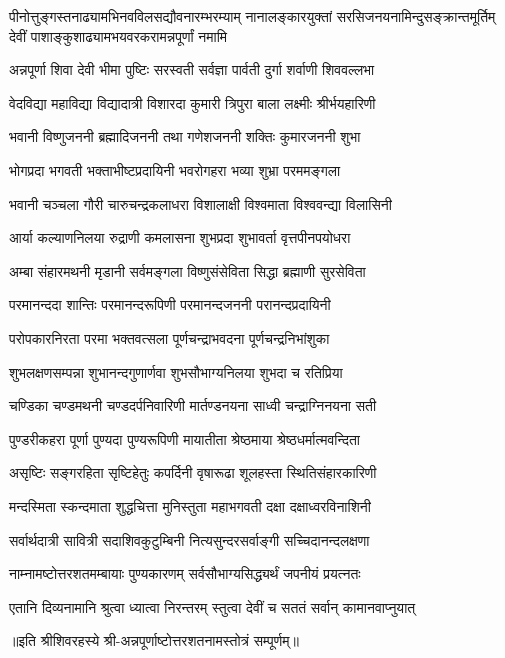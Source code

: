 
{पीनोत्तुङ्गस्तनाढ्यामभिनवविलसद्यौवनारम्भरम्याम्}
{नानालङ्कारयुक्तां सरसिजनयनामिन्दुसङ्क्रान्तमूर्तिम्}
{देवीं पाशाङ्कुशाढ्यामभयवरकरामन्नपूर्णां नमामि}


\twolineshloka
{अन्नपूर्णा शिवा देवी भीमा पुष्टिः सरस्वती}
{सर्वज्ञा पार्वती दुर्गा शर्वाणी शिववल्लभा}

\twolineshloka
{वेदविद्या महाविद्या विद्यादात्री विशारदा}
{कुमारी त्रिपुरा बाला लक्ष्मीः श्रीर्भयहारिणी}

\twolineshloka
{भवानी विष्णुजननी ब्रह्मादिजननी तथा}
{गणेशजननी शक्तिः कुमारजननी शुभा}

\twolineshloka
{भोगप्रदा भगवती भक्ताभीष्टप्रदायिनी}
{भवरोगहरा भव्या शुभ्रा परममङ्गला}

\twolineshloka
{भवानी चञ्चला गौरी चारुचन्द्रकलाधरा}
{विशालाक्षी विश्वमाता विश्ववन्द्या विलासिनी}

\twolineshloka
{आर्या कल्याणनिलया रुद्राणी कमलासना}
{शुभप्रदा शुभावर्ता वृत्तपीनपयोधरा}

\twolineshloka
{अम्बा संहारमथनी मृडानी सर्वमङ्गला}
{विष्णुसंसेविता सिद्धा ब्रह्माणी सुरसेविता}

\twolineshloka
{परमानन्ददा शान्तिः परमानन्दरूपिणी}
{परमानन्दजननी परानन्दप्रदायिनी}

\twolineshloka
{परोपकारनिरता परमा भक्तवत्सला}
{पूर्णचन्द्राभवदना पूर्णचन्द्रनिभांशुका}

\twolineshloka
{शुभलक्षणसम्पन्ना शुभानन्दगुणार्णवा}
{शुभसौभाग्यनिलया शुभदा च रतिप्रिया}

\twolineshloka
{चण्डिका चण्डमथनी चण्डदर्पनिवारिणी}
{मार्तण्डनयना साध्वी चन्द्राग्निनयना सती}

\twolineshloka
{पुण्डरीकहरा पूर्णा पुण्यदा पुण्यरूपिणी}
{मायातीता श्रेष्ठमाया श्रेष्ठधर्मात्मवन्दिता}

\twolineshloka
{असृष्टिः सङ्गरहिता सृष्टिहेतुः कपर्दिनी}
{वृषारूढा शूलहस्ता स्थितिसंहारकारिणी}

\twolineshloka
{मन्दस्मिता स्कन्दमाता शुद्धचित्ता मुनिस्तुता}
{महाभगवती दक्षा दक्षाध्वरविनाशिनी}

\twolineshloka
{सर्वार्थदात्री सावित्री सदाशिवकुटुम्बिनी}
{नित्यसुन्दरसर्वाङ्गी सच्चिदानन्दलक्षणा}

\twolineshloka
{नाम्नामष्टोत्तरशतमम्बायाः पुण्यकारणम्}
{सर्वसौभाग्यसिद्ध्यर्थं जपनीयं प्रयत्नतः}

\twolineshloka
{एतानि दिव्यनामानि श्रुत्वा ध्यात्वा निरन्तरम्}
{स्तुत्वा देवीं च सततं सर्वान् कामानवाप्नुयात्}

{॥इति श्रीशिवरहस्ये श्री-अन्नपूर्णाष्टोत्तरशतनामस्तोत्रं सम्पूर्णम्॥}
